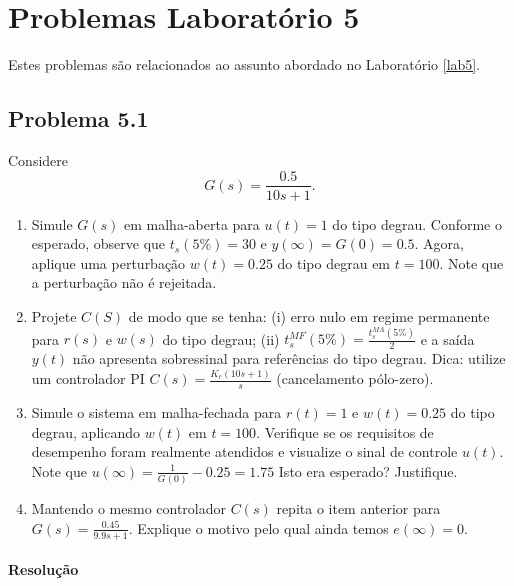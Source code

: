 \documentclass[
]{book}
\providecommand{\tightlist}{%
  \setlength{\itemsep}{0pt}\setlength{\parskip}{0pt}}
\theoremstyle{definition}
\theoremstyle{definition}
\theoremstyle{definition}
\theoremstyle{remark}
\begin{document}
\hypertarget{problemas-laboratuxf3rio-5}{%
\chapter*{Problemas Laboratório 5}\label{problemas-laboratuxf3rio-5}}

Estes problemas são relacionados ao assunto abordado no Laboratório \ref{lab5}.

\hypertarget{problema-5.1}{%
\section*{Problema 5.1}\label{problema-5.1}}

Considere
\[
G(s) = \frac {0.5}{10s+1}.
\]

\begin{enumerate}
\def\labelenumi{(\alph{enumi})}
\tightlist
\item
  Simule \(G(s)\) em malha-aberta para \(u(t) = 1\) do tipo degrau. Conforme o esperado, observe que \(t_s(5\%) = 30\) e \(y(\infty) = G(0) = 0.5\). Agora, aplique uma perturbação \(w(t) = 0.25\) do tipo degrau em \(t=100\). Note que a perturbação não é rejeitada.
\item
  Projete \(C(S)\) de modo que se tenha: (i) erro nulo em regime permanente para \(r(s)\) e \(w(s)\) do tipo degrau; (ii) \(t_s^{MF}(5\%) = \frac {t_s^{MA}(5\%)}{2}\) e a saída \(y(t)\) não apresenta sobressinal para referências do tipo degrau. Dica: utilize um controlador PI \(C(s) = \frac{K_c(10s+1)}{s}\) (cancelamento pólo-zero).
\item
  Simule o sistema em malha-fechada para \(r(t) =1\) e \(w(t) = 0.25\) do tipo degrau, aplicando \(w(t)\) em \(t=100\). Verifique se os requisitos de desempenho foram realmente atendidos e visualize o sinal de controle \(u(t)\). Note que \(u(\infty) = \frac {1}{G(0)}-0.25 = 1.75\) Isto era esperado? Justifique.
\item
  Mantendo o mesmo controlador \(C(s)\) repita o item anterior para \(G(s) = \frac {0.45}{9.9s+1}\). Explique o motivo pelo qual ainda temos \(e(\infty) = 0\).
\end{enumerate}

\hypertarget{resoluuxe7uxe3o}{%
\subsubsection*{Resolução}\label{resoluuxe7uxe3o}}
\end{document}
